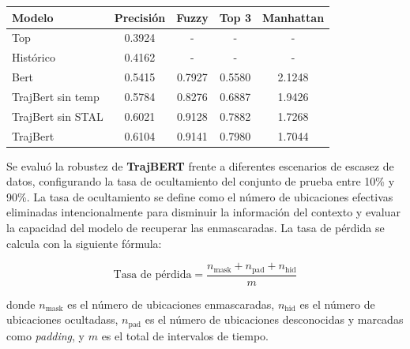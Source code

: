 \begin{table}[ht]
\centering
\begin{tabular}{|l|c|c|c|c|}
\hline
\textbf{Modelo} & \textbf{Precisión} & \textbf{Fuzzy} & \textbf{Top 3}         &  \textbf{Manhattan}   \\ \hline
Top                  & 0.3924         & -                    & -               &       -               \\ \hline
Histórico            & 0.4162         & -                    & -               &       -               \\ \hline
Bert                 & 0.5415         & 0.7927             & 0.5580            &     2.1248            \\ \hline
TrajBert sin temp    & 0.5784         & 0.8276             & 0.6887            &     1.9426            \\ \hline
TrajBert sin STAL    & 0.6021         & 0.9128             & 0.7882            &     1.7268            \\ \hline
TrajBert             & 0.6104         & 0.9141             & 0.7980            &     1.7044            \\ \hline
\end{tabular}
\label{tab:model_comparison}
\end{table}


Se evaluó la robustez de \textbf{TrajBERT} frente a diferentes escenarios de escasez de datos, configurando la tasa de ocultamiento del conjunto de prueba entre 10\% y 90\%. La tasa de ocultamiento se define como el número de ubicaciones efectivas eliminadas intencionalmente para disminuir la información del contexto y evaluar la capacidad del modelo de recuperar las enmascaradas. La tasa de pérdida se calcula con la siguiente fórmula:

\begin{equation}
\text{Tasa de pérdida} = \frac{n_{\text{mask}} + n_{\text{pad}} + n_{\text{hid}}}{m}
\end{equation}

\noindent
donde $n_{\text{mask}}$ es el número de ubicaciones enmascaradas, $n_{\text{hid}}$ es el número de ubicaciones ocultadass, $n_{\text{pad}}$ es el número de ubicaciones desconocidas y marcadas como \textit{padding}, y $m$ es el total de intervalos de tiempo.

